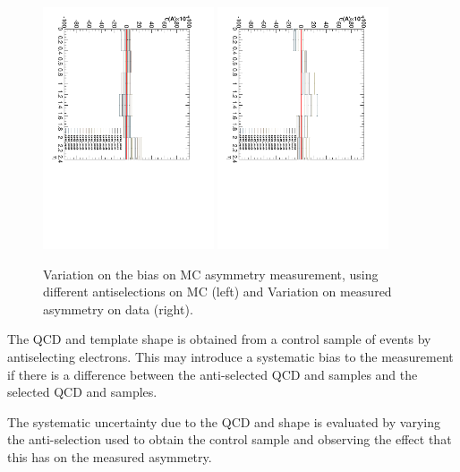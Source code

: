 \begin{figure}[htb]
 \begin{center}
 \includegraphics*[width=0.45\textwidth, angle=90]{QCDBias}
 \includegraphics*[width=0.45\textwidth, angle=90]{QCDBias_data.pdf}
 \caption{Variation on the bias on MC asymmetry measurement, using different antiselections on MC (left) and Variation on measured asymmetry on data (right).}
    \label{fig:systQCDMC}
  \end{center}
\end{figure}


The \ac{QCD} and \gjet \ETm template shape is obtained from a control sample of
events by antiselecting electrons. This may introduce a systematic bias to the
measurement if there is a difference between the anti-selected \ac{QCD} and \gjet
\ETm samples and the selected \ac{QCD} and \gjet samples.

The systematic uncertainty due to the \ac{QCD} and \gjet \ETm shape is evaluated by
varying the anti-selection used to obtain the control sample and observing the
effect that this has on the measured asymmetry.

